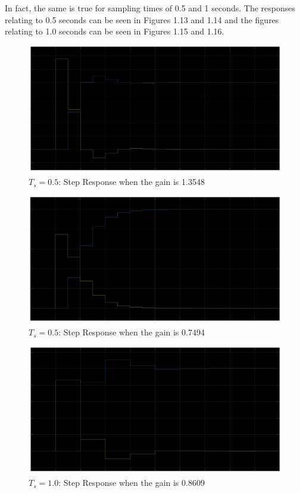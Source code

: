 \documentclass[stu, a4paper, 12pt, floatsintext]{apa7}
\numberwithin{figure}{section}
\numberwithin{table}{section}
\numberwithin{equation}{section}
\begin{document}
In fact, the same is true for sampling times of 0.5 and 1 seconds. The responses relating to 0.5 seconds can be seen in Figures 1.13 and 1.14 and the figures relating to 1.0 seconds can be seen in Figures 1.15 and 1.16.
\begin{figure}[H]
    \caption{$T_s = 0.5$: Step Response when the gain is 1.3548}
    \label{fig:0.5_Ts_step_response_2}
    \centering
    \includegraphics[width=1.1\textwidth]{pictures/task2_0.5_step_response_1.jpg}
\end{figure}
\begin{figure}[H]
    \caption{$T_s = 0.5$: Step Response when the gain is 0.7494}
    \label{fig:0.5_Ts_step_response_2}
    \centering
    \includegraphics[width=1.1\textwidth]{pictures/task2_0.5_step_response_2.jpg}
\end{figure}
\begin{figure}[H]
    \caption{$T_s = 1.0$: Step Response when the gain is 0.8609}
    \label{fig:1.0_Ts_step_response_2}
    \centering
    \includegraphics[width=1.1\textwidth]{pictures/task2_1.0_step_response_1.jpg}
\end{figure}
\end{document}
